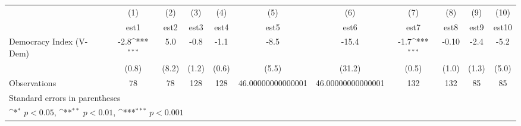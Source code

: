 {
\def\sym#1{\ifmmode^{#1}\else\(^{#1}\)\fi}
\begin{tabular}{l*{10}{c}}
\hline\hline
                    &\multicolumn{1}{c}{(1)}         &\multicolumn{1}{c}{(2)}         &\multicolumn{1}{c}{(3)}         &\multicolumn{1}{c}{(4)}         &\multicolumn{1}{c}{(5)}         &\multicolumn{1}{c}{(6)}         &\multicolumn{1}{c}{(7)}         &\multicolumn{1}{c}{(8)}         &\multicolumn{1}{c}{(9)}         &\multicolumn{1}{c}{(10)}         \\
                    &        est1         &        est2         &        est3         &        est4         &        est5         &        est6         &        est7         &        est8         &        est9         &       est10         \\
\hline
Democracy Index (V-Dem)&        -2.8\sym{***}&         5.0         &        -0.8         &        -1.1         &        -8.5         &       -15.4         &        -1.7\sym{***}&       -0.10         &        -2.4         &        -5.2         \\
                    &       (0.8)         &       (8.2)         &       (1.2)         &       (0.6)         &       (5.5)         &      (31.2)         &       (0.5)         &       (1.0)         &       (1.3)         &       (5.0)         \\
\hline
Observations        &          78         &          78         &         128         &         128         &46.00000000000001         &46.00000000000001         &         132         &         132         &          85         &          85         \\
\hline\hline
\multicolumn{11}{l}{\footnotesize Standard errors in parentheses}\\
\multicolumn{11}{l}{\footnotesize \sym{*} \(p<0.05\), \sym{**} \(p<0.01\), \sym{***} \(p<0.001\)}\\
\end{tabular}
}
